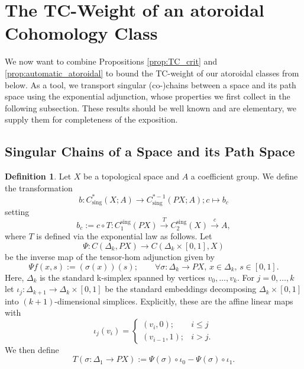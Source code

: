 \documentclass[a4paper,twoside]{article}
\theoremstyle{plain}
\theoremstyle{definition}
\newtheorem{definition}[theorem]{Definition}
\theoremstyle{remark}
\DeclareMathOperator{\sing}{sing}
\begin{document}
\section{The TC-Weight of an atoroidal Cohomology Class}

We now want to combine Propositions \ref{prop:TC_crit} and
\ref{prop:automatic_atoroidal} to bound the TC-weight of our atoroidal classes
from below. As a tool, we transport singular (co-)chains between a
space and its path space using the exponential adjunction, whose properties we
first collect in the following subsection. These results should be well known
and are elementary, we supply them for completeness of the exposition.

\subsection{Singular Chains of a Space and its Path Space}

\begin{definition}\label{def:curring}
  Let $X$ be a topological space and $A$ a coefficient group. We define the transformation
  \begin{equation*}
    b\colon C^*_{\sing}(X;A) \to C_{\sing}^{*-1}(PX;A); c\mapsto b_c
  \end{equation*}
  setting 
  \begin{equation*}
    b_c:= c\circ T\colon C_1^{\sing}(PX)\xrightarrow{T} C_2^{\sing}(X)\xrightarrow{c} A,
  \end{equation*}
  where $T$ is defined via the exponential law as follows.
  Let
  \begin{equation*}
    \Psi\colon C(\Delta_k, PX) \to C(\Delta_k\times [0,1],X) 
  \end{equation*}
  be the inverse map of the tensor-hom adjunction given by
  \begin{equation*}
    \Psi f (x,s):= (\sigma(x))(s);\qquad \forall \sigma\colon \Delta_k\to PX,\,x\in \Delta_k,\, s\in [0,1].
  \end{equation*}
  Here, $\Delta_k$ is the standard k-simplex spanned by vertices $v_0,\dots,v_k$.
  For $j=0,\dots,k$ let $\iota_j\colon \Delta_{k+1}\to \Delta_k\times [0,1]$
  be the standard embeddings decomposing $\Delta_k\times [0,1]$ 
  into $(k+1)$-dimensional simplices. Explicitly, these are the affine linear maps with
  \begin{equation}\label{eq:decomp_incl}
    \iota_j(v_i) =
    \begin{cases}
      (v_i,0); & i\le j\\
      (v_{i-1},1); & i>j.
    \end{cases}
  \end{equation}
  We then define
  \begin{equation*}
    T(\sigma\colon \Delta_1\to PX):= \Psi(\sigma)\circ \iota_0  -
    \Psi(\sigma)\circ \iota_1.
  \end{equation*}
\end{definition}
\end{document}
